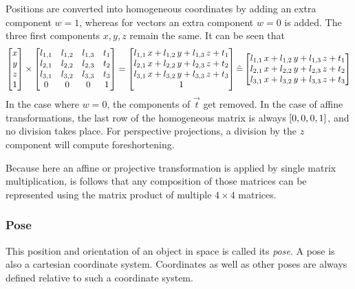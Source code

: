 Positions are converted into homogeneous coordinates by adding an extra component $w = 1$, whereas for vectors an extra component $w = 0$ is added. The three first components $x, y, z$ remain the same. It can be seen that
\begin{equation}
\left[ \begin{matrix}
	x \\ y \\ z \\ 1
\end{matrix} \right] \times  \left[ \begin{matrix}
	l_{1,1} & l_{1,2} & l_{1,3} & t_1 \\
	l_{2,1} & l_{2,2} & l_{2,3} & t_2 \\
	l_{3,1} & l_{3,2} & l_{3,3} & t_3 \\
	0 & 0 & 0 & 1
\end{matrix} \right] = \left[ \begin{matrix}
	l_{1,1} \, x + l_{1,2} \, y + l_{1,3} \, z + t_1 \\
	l_{2,1} \, x + l_{2,2} \, y + l_{2,3} \, z + t_2 \\
	l_{3,1} \, x + l_{3,2} \, y + l_{3,3} \, z + t_3 \\
	1
\end{matrix} \right] \hat{=} \left[ \begin{matrix}
	l_{1,1} \, x + l_{1,2} \, y + l_{1,3} \, z + t_1 \\
	l_{2,1} \, x + l_{2,2} \, y + l_{2,3} \, z + t_2 \\
	l_{3,1} \, x + l_{3,2} \, y + l_{3,3} \, z + t_3 \\
\end{matrix} \right]
\end{equation}
In the case where $w = 0$, the components of $\vec{t}$ get removed. In the case of affine transformations, the last row of the homogeneous matrix is always $\left[0, 0, 0, 1\right]$, and no division takes place. For perspective projections, a division by the $z$ component will compute foreshortening.

Because here an affine or projective transformation is applied by single matrix multiplication, is follows that any composition of those matrices can be represented using the matrix product of multiple $4 \times 4$ matrices.

\subsubsection{Pose}
This position and orientation of an object in space is called its \emph{pose}. A pose is also a cartesian coordinate system. Coordinates as well as other poses are always defined relative to such a coordinate system.

